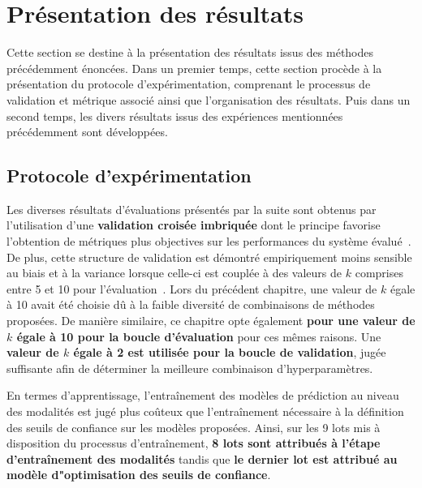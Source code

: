 \clearpage

\section{Présentation des résultats}
Cette section se destine à la présentation des résultats issus des méthodes précédemment énoncées. Dans un premier temps, cette section procède à la présentation du protocole d'expérimentation, comprenant le processus de validation et métrique associé ainsi que l'organisation des résultats. Puis dans un second temps, les divers résultats issus des expériences mentionnées précédemment sont développées.\par

\subsection{Protocole d’expérimentation}
Les diverses résultats d'évaluations présentés par la suite sont obtenus par l'utilisation d'une \textbf{validation croisée imbriquée} dont le principe favorise l'obtention de métriques plus objectives sur les performances du système évalué~\cite{Cawley2010}. De plus, cette structure de validation est démontré empiriquement moins sensible au biais et à la variance lorsque celle-ci est couplée à des valeurs de $k$ comprises entre 5 et 10 pour l'évaluation~\cite{James2000}. Lors du précédent chapitre, une valeur de $k$ égale à 10 avait été choisie dû à la faible diversité de combinaisons de méthodes proposées. De manière similaire, ce chapitre opte également \textbf{pour une valeur de $k$ égale à 10 pour la boucle d'évaluation} pour ces mêmes raisons. Une \textbf{valeur de $k$ égale à 2 est utilisée pour la boucle de validation}, jugée suffisante afin de déterminer la meilleure combinaison d'hyperparamètres.\par

En termes d'apprentissage, l'entraînement des modèles de prédiction au niveau des modalités est jugé plus coûteux que l'entraînement nécessaire à la définition des seuils de confiance sur les modèles proposées. Ainsi, sur les 9 lots mis à disposition du processus d'entraînement, \textbf{8 lots sont attribués à l'étape d'entraînement des modalités} tandis que \textbf{le dernier lot est attribué au modèle d"optimisation des seuils de confiance}.\par

